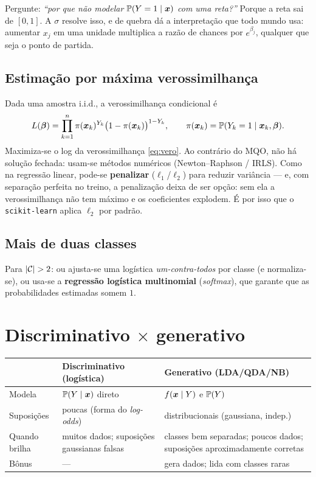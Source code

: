 \documentclass[11pt,a4paper]{article}
\begin{document}
\begin{emsala}
Pergunte: \emph{``por que não modelar $\mathbb{P}(Y=1\mid\bm{x})$ com uma reta?''} Porque a
reta sai de $[0,1]$. A $\sigma$ resolve isso, e de quebra dá a interpretação que
todo mundo usa: aumentar $x_j$ em uma unidade multiplica a razão de chances por
$e^{\beta_j}$, qualquer que seja o ponto de partida.
\end{emsala}

\subsection{Estimação por máxima verossimilhança}
Dada uma amostra i.i.d., a verossimilhança condicional é
\begin{equation}\label{eq:vero}
  L(\bm{\beta}) = \prod_{k=1}^n \pi(\bm{x}_k)^{Y_k}\big(1-\pi(\bm{x}_k)\big)^{1-Y_k},
  \qquad \pi(\bm{x}_k)=\mathbb{P}(Y_k=1\mid\bm{x}_k,\bm{\beta}).
\end{equation}
Maximiza-se o log da verossimilhança \eqref{eq:vero}. Ao contrário do MQO, não há
solução fechada: usam-se métodos numéricos (Newton--Raphson / IRLS). Como na
regressão linear, pode-se \textbf{penalizar} ($\ell_1$/$\ell_2$) para reduzir
variância --- e, com separação perfeita no treino, a penalização deixa de ser opção:
sem ela a verossimilhança não tem máximo e os coeficientes explodem. É por isso que
o \texttt{scikit-learn} aplica $\ell_2$ por padrão.

\subsection{Mais de duas classes}
Para $\left\lvert \mathcal{C} \right\rvert>2$: ou ajusta-se uma logística \emph{um-contra-todos} por
classe (e normaliza-se), ou usa-se a \textbf{regressão logística multinomial}
(\emph{softmax}), que garante que as probabilidades estimadas somem $1$.

\section{Discriminativo $\times$ generativo}
\begin{center}\small
\renewcommand{\arraystretch}{1.3}
\begin{tabular}{@{}p{3.2cm}p{5.4cm}p{5.4cm}@{}}
\toprule
 & \textbf{Discriminativo (logística)} & \textbf{Generativo (LDA/QDA/NB)} \\
\midrule
Modela & $\mathbb{P}(Y\mid\bm{x})$ direto & $f(\bm{x}\mid Y)$ e $\mathbb{P}(Y)$ \\
Suposições & poucas (forma do \emph{log-odds}) & distribucionais (gaussiana, indep.) \\
Quando brilha & muitos dados; suposições gaussianas falsas & classes bem separadas; poucos dados; suposições aproximadamente corretas \\
Bônus & --- & gera dados; lida com classes raras \\
\bottomrule
\end{tabular}
\end{center}
\end{document}
